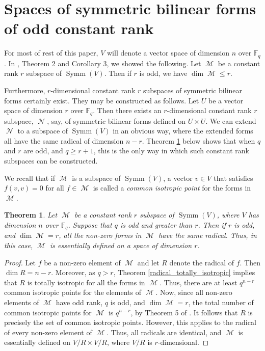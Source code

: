 \documentclass{amsart}
\DeclareMathOperator{\M}{\mathcal{M}}
\DeclareMathOperator{\N}{\mathcal{N}}
\DeclareMathOperator{\Symm}{Symm}
\theoremstyle{plain}
\newtheorem{theorem}{Theorem}
\theoremstyle{definition}
\begin{document}
\section{Spaces of symmetric bilinear forms of odd constant rank}

\noindent For most of rest of this paper, $V$ will denote a vector space
of dimension $n$ over $\mathbb{F}_q$. In \cite{DGS}, Theorem 2 and Corollary 3, we showed the following. Let $\M$ be a 
constant rank $r$ subspace of  $\Symm(V)$. Then if $r$ is odd, we have $\dim \M\leq r$. 

Furthermore,
$r$-dimensional constant rank $r$ subspaces of symmetric bilinear forms certainly exist. They may be constructed as follows. Let $U$ be a vector space of dimension $r$ over $\mathbb{F}_q$. Then there exists an $r$-dimensional constant rank $r$ subspace, $\N$, say, of symmetric bilinear
forms defined on $U\times U$. We can extend $\N$ to a subspace of  $\Symm(V)$ in an obvious way, where the extended forms all have the same radical of dimension $n-r$. 
Theorem \ref{common_radicals} below shows  that when $q$ and $r$ are odd, and $q\geq r+1$, this is the only way in which such constant rank  subspaces can be constructed.

We recall that if $\M$ is a subspace of  $\Symm(V)$, a vector $v\in V$ that satisfies $f(v,v)=0$
for all $f\in\M$ is called a \emph{common isotropic point} for the forms in $\M$.

\begin{theorem} \label{common_radicals}
Let $\M$ be a constant rank $r$ subspace of  $\Symm(V)$, where $V$ has
dimension $n$ over $\mathbb{F}_q$. Suppose that $q$ is odd and greater than $r$. Then if $r$ is odd, and $\dim \M=r$, all the non-zero
forms in $\M$ have the same radical. Thus, in this case, $\M$ is essentially defined on a space of dimension $r$.
\end{theorem}


\begin{proof} Let $f$ be a non-zero element of $\M$ and let $R$ denote the radical of $f$. Then $\dim R=n-r$. Moreover, as $q>r$, Theorem \ref{radical_totally_isotropic} implies that $R$ is totally isotropic for all the forms in $\M$. Thus, there are at least
$q^{n-r}$ common isotropic points for the elements of $\M$. Now, since all non-zero elements of $\M$ have odd rank, $q$ is odd, and
$\dim \M=r$, the total 
number of common isotropic points for $\M$ is $q^{n-r}$, by Theorem 5 of \cite{DGS}. It follows that $R$ is precisely the set of common isotropic points. However,
this applies to the radical of every non-zero element of $\M$. Thus, all radicals are identical, and $\M$ is essentially defined on
$V/R \times V/R$, where $V/R$ is $r$-dimensional.

\end{proof}
\end{document}
